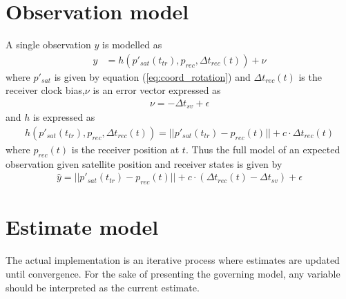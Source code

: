 \documentclass[]{article}
\begin{document}
\section{Observation model}
A single observation $y$ is modelled as 
\begin{align}
y&=h(p'_{sat}(t_{tr}), p_{rec}, \Delta t_{rec}(t))+\nu
\end{align}
where $p'_{sat}$ is given by equation (\ref{eq:coord_rotation}) and $\Delta t_{rec}(t)$ is the receiver clock bias,$\nu$ is an error vector expressed as
\begin{align*}
\nu=-\Delta t_{sv}+\epsilon
\end{align*}
and $h$ is expressed as
\begin{align*}
h(p'_{sat}(t_{tr}),p_{rec}, \Delta t_{rec}(t))=||p'_{sat}(t_{tr})-p_{rec}(t)||+c\cdot\Delta t_{rec}(t)
\end{align*}
where $p_{rec}(t)$ is the receiver position at $t$. Thus the full model of an expected observation given satellite position and receiver states is given by
\begin{align}\label{eq:obs_model}
\hat{y}=||p'_{sat}(t_{tr})-p_{rec}(t)||+c\cdot(\Delta t_{rec}(t)-\Delta t_{sv})+\epsilon
\end{align}

\section{Estimate model}
The actual implementation is an iterative process where estimates are updated until convergence. For the sake of presenting the governing model, any variable should be interpreted as the current estimate.
\end{document}

